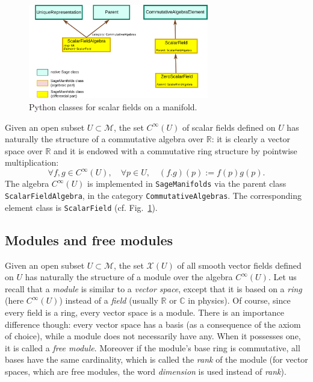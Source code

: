 \documentclass[a4paper]{jpconf}
\newcommand{\soft}[1]{\texttt{#1}}
\newcommand{\code}[1]{\texttt{#1}}
\newcommand{\SM}{\soft{SageManifolds}}
\newcommand{\be}{\begin{equation}}
\newcommand{\ee}{\end{equation}}
\begin{document}
\begin{figure}
\begin{center}
\includegraphics[width=0.7\textwidth]{scalar_classes.pdf}
\end{center}
\caption{\label{f:scalar_classes} Python classes for scalar fields
on a manifold.}
\end{figure}

Given an open subset $U\subset\mathcal{M}$, the set $C^\infty(U)$
of scalar fields defined on $U$ has naturally the structure of a 
commutative algebra over $\mathbb{R}$: it is clearly a vector
space over $\mathbb{R}$ and it is endowed with a commutative ring structure
by pointwise multiplication:
\be
\forall f, g \in C^\infty(U),\quad \forall p\in U,\quad
(f.g)(p) := f(p) g(p) .
\ee
The algebra $C^\infty(U)$ is implemented in \SM{} via the parent
class \code{ScalarFieldAlgebra}, in the category
\code{CommutativeAlgebras}. The corresponding element class 
is \code{ScalarField} (cf. Fig.~\ref{f:scalar_classes}). 

\subsection{Modules and free modules} \label{s:modules}

Given an open subset $U\subset\mathcal{M}$, the set $\mathcal{X}(U)$
of all smooth vector fields defined on $U$ has naturally the structure of a 
module over the algebra $C^\infty(U)$.
Let us recall that a \emph{module} is similar to a \emph{vector space}, except that it is based
on a \emph{ring} (here $C^\infty(U)$)
instead of a \emph{field} (usually $\mathbb{R}$ or
$\mathbb{C}$ in physics). Of course, since every field is a ring, every vector space is a module.
There is an importance difference though: every vector space has a basis (as a 
consequence of the axiom of choice),
while a module does not necessarily have any. 
When it possesses one, it is called a \emph{free module}. 
Moreover if the module's base ring is commutative, all bases have the same
cardinality, which is called the \emph{rank} of the module 
(for vector spaces, which are free modules, the word \emph{dimension}
is used instead of \emph{rank}). 
\end{document}
